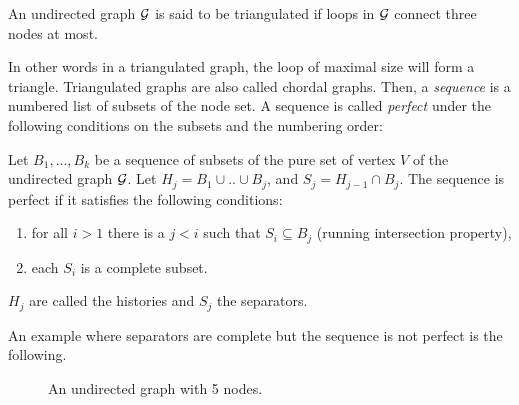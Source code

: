  \begin{definition}
 An undirected graph $\mathcal{G}$ is said to be triangulated if loops in $\mathcal{G}$ connect three nodes at most.
 \end{definition} 
 In other words in a triangulated graph, the loop of maximal size will form a triangle. Triangulated graphs are also called chordal graphs. Then, a \textit{sequence} is a numbered list of subsets of the node set. A sequence is called \textit{perfect} under the following conditions on the subsets and the numbering order:
 \begin{definition}\label{def:seq}
 Let $B_1,...,B_k$ be a sequence of subsets of the pure set of vertex $V$ of the undirected graph $\mathcal{G}$. Let $H_j=B_1\cup .. \cup B_j$, and $S_j = H_{j-1} \cap B_j$. The sequence is perfect if it satisfies the following conditions:
 \begin{enumerate}[label=(\roman*)]
 \item for all $i>1$ there is a $j<i$ such that $S_i \subseteq B_j$ (running intersection property),
 \item each $S_i$ is a complete subset.
 \end{enumerate}
 $H_j$ are called the histories and $S_j$ the separators.
 \end{definition}
 An example where separators are complete but the sequence is not perfect is the following.
\begin{figure}[H]
 \begin{center}
 \caption{An undirected graph with 5 nodes.}
  \label{ex:graph1}
    \end{center}
\end{figure}
